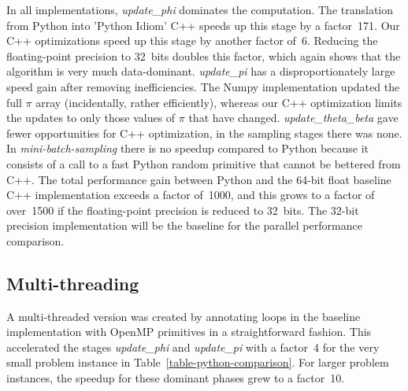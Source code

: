 In all implementations, \textit{update\_phi} dominates the computation.
The translation from Python into 'Python Idiom' C++ speeds up this stage
by a factor~171. %
Our C++ optimizations speed up this stage
by another factor of~6. Reducing the floating-point precision to 32~bits
doubles this factor, which again shows that the algorithm is very much data-dominant.
%
\textit{update\_pi} has a disproportionately large speed
gain after removing inefficiencies. The Numpy implementation updated the full
$\pi$ array (incidentally, rather efficiently), whereas our C++ optimization
limits the updates to only those values of $\pi$ that have changed.
%
\textit{update\_theta\_beta} gave fewer opportunities for C++ optimization,
in the sampling stages there was none. In \textit{mini-batch-sampling} there
is no speedup compared to Python because it consists of a call to
a fast Python random primitive that cannot be bettered from C++.
The total performance gain between Python and the 64-bit float baseline C++
implementation exceeds a factor of~1000, and this grows to a factor of over~1500
if the floating-point precision is reduced to 32~bits. The 32-bit precision
implementation will be the baseline for the parallel performance comparison.

\subsection{Multi-threading}

A multi-threaded version was created by annotating loops in the
baseline implementation with OpenMP primitives in a straightforward
fashion. This accelerated the stages \textit{update\_phi} and
\textit{update\_pi} with a factor~4 for the very small problem instance
in Table~\ref{table-python-comparison}. For larger problem instances, the
speedup for these dominant phases grew to a factor~10.

\begin{comment}
The introduction of a custom user-space random generator brings at most
a very small
benefit. We show it, because it is necessary for the multi-threaded
implementations described in the next section, and this measurement serves to
prove that it does not harm execution speed.
\end{comment}
